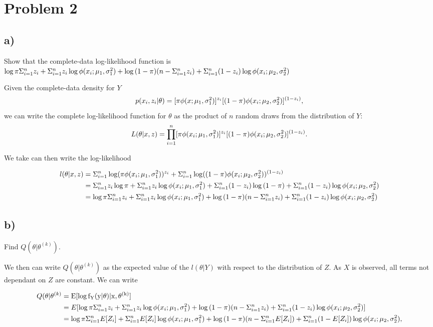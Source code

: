 \documentclass[]{article}
\begin{document}
\section{Problem 2}\label{problem-2}

\subsection{a)}\label{a-1}

Show that the complete-data log-likelihood function is
\(\log{\pi} \Sigma_{i=1}^{n} z_i + \Sigma_{i=1}^{n} z_i \log{\phi(x_i; \mu_{1}, \sigma_{1}^2)} + \log{(1-\pi)}(n - \Sigma_{i=1}^{n} z_i) + \Sigma_{i=1}^{n} (1 - z_i)\log{\phi(x_i; \mu_{2}, \sigma_{2}^2)}\)

Given the complete-data density for \(Y\) \[
p(x_i, z_i|\theta) = [\pi \phi(x; \mu_1, \sigma_1^2)]^{z_i}[(1 - \pi)\phi(x_i; \mu_{2}, \sigma_{2}^2)]^{(1 - z_i)},
\] we can write the complete log-likelihood function for \(\theta\) as
the product of \(n\) random draws from the distribution of \(Y\): \[
L(\theta| x, z)=\prod_{i=1}^{n}[\pi\phi(x_i; \mu_{1}, \sigma_{1}^2)]^{z_i}[(1 - \pi) \phi(x_i; \mu_{2}, \sigma_{2}^2)]^{(1 - z_i)}.
\]

We take can then write the log-likelihood

\begin{align*}
l(\theta | x, z) &= \Sigma_{i=1}^{n} \log(\pi \phi(x_i; \mu_{1}, \sigma_{1}^2))^{z_i} + \Sigma_{i=1}^{n} \log((1-\pi) \phi(x_i; \mu_{2}, \sigma_{2}^2))^{(1-z_i)} \\
&= \Sigma_{i=1}^{n} z_i \log{\pi} + \Sigma_{i=1}^{n} z_i \log{\phi(x_i; \mu_{1}, \sigma_{1}^2)} + \Sigma_{i=1}^{n}(1-z_i)\log{(1-\pi)} + \Sigma_{i=1}^{n}(1- z_i) \log{\phi(x_i; \mu_{2}, \sigma_{2}^2)} \\
&= \log{\pi} \Sigma_{i=1}^{n} z_i + \Sigma_{i=1}^{n} z_i \log{\phi(x_i; \mu_{1}, \sigma_{1}^2)} + \log{(1-\pi)}(n - \Sigma_{i=1}^{n} z_i) + \Sigma_{i=1}^{n} (1 - z_i)\log{\phi(x_i; \mu_{2}, \sigma_{2}^2)}
\end{align*}

\subsection{b)}\label{b-1}

Find \(Q(\theta|\theta^{(k)})\).

We then can write \(Q(\theta | \theta^{(k)})\) as the expected value of
the \(l(\theta | Y)\) with respect to the distribution of \(Z\). As
\(X\) is observed, all terms not dependant on \(Z\) are constant. We can
write

\begin{align*}
Q(\theta | \theta^{(k)} &= \rm{E}[\log f_Y(y|\theta) | x, \theta^{(k)}] \\
&= E[\log{\pi} \Sigma_{i=1}^{n} z_i + \Sigma_{i=1}^{n} z_i \log{\phi(x_i; \mu_{1}, \sigma_{1}^2)} + \log{(1-\pi)}(n - \Sigma_{i=1}^{n} z_i) + \Sigma_{i=1}^{n} (1 - z_i)\log{\phi(x_i; \mu_{2}, \sigma_{2}^2)}]\\ &= 
\log{\pi} \Sigma_{i=1}^{n} E[Z_i] + \Sigma_{i=1}^{n} E[Z_i] \log{\phi(x_i; \mu_{1}, \sigma_{1}^2)} + \log{(1-\pi)}(n - \Sigma_{i=1}^{n} E[Z_i]) + \Sigma_{i=1}^{n} (1 - E[Z_i])\log{\phi(x_i; \mu_{2}, \sigma_{2}^2)}, 
\end{align*}
\end{document}
